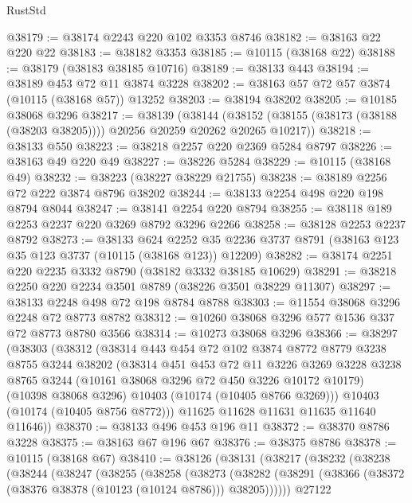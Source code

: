 \begin{lexlean}{RustStd}
\begin{coremodule}
@38179 := @38174 @2243 @220 @102 @3353 @8746
@38182 := @38163 @22 @220 @22
@38183 := @38182 @3353
@38185 := @10115 (@38168 @22)
@38188 := @38179 (@38183 @38185 @10716)
@38189 := @38133 @443
@38194 := @38189 @453 @72 @11 @3874 @3228
@38202 := @38163 @57 @72 @57 @3874 (@10115 (@38168 @57)) @13252
@38203 := @38194 @38202
@38205 := @10185 @38068 @3296
@38217 := @38139
    (@38144 (@38152 (@38155 (@38173 (@38188 (@38203 @38205)))) @20256 @20259 @20262 @20265 @10217))
@38218 := @38133 @550
@38223 := @38218 @2257 @220 @2369 @5284 @8797
@38226 := @38163 @49 @220 @49
@38227 := @38226 @5284
@38229 := @10115 (@38168 @49)
@38232 := @38223 (@38227 @38229 @21755)
@38238 := @38189 @2256 @72 @222 @3874 @8796 @38202
@38244 := @38133 @2254 @498 @220 @198 @8794 @8044
@38247 := @38141 @2254 @220 @8794
@38255 := @38118 @189 @2253 @2237 @220 @3269 @8792 @3296 @2266
@38258 := @38128 @2253 @2237 @8792
@38273 := @38133
    @624
    @2252
    @35
    @2236
    @3737
    @8791
    (@38163 @123 @35 @123 @3737 (@10115 (@38168 @123)) @12209)
@38282 := @38174 @2251 @220 @2235 @3332 @8790 (@38182 @3332 @38185 @10629)
@38291 := @38218 @2250 @220 @2234 @3501 @8789 (@38226 @3501 @38229 @11307)
@38297 := @38133 @2248 @498 @72 @198 @8784 @8788
@38303 := @11554 @38068 @3296 @2248 @72 @8773 @8782
@38312 := @10260 @38068 @3296 @577 @1536 @337 @72 @8773 @8780 @3566
@38314 := @10273 @38068 @3296
@38366 := @38297
    (@38303
      (@38312
        (@38314
          @443
          @454
          @72
          @102
          @3874
          @8772
          @8779
          @3238
          @8755
          @3244
          @38202
          (@38314
            @451
            @453
            @72
            @11
            @3226
            @3269
            @3228
            @3238
            @8765
            @3244
            (@10161 @38068 @3296 @72 @450 @3226 @10172 @10179)
            (@10398 @38068 @3296)
            @10403
            (@10174 (@10405 @8766 @3269)))
          @10403
          (@10174 (@10405 @8756 @8772)))
        @11625
        @11628
        @11631
        @11635
        @11640
        @11646))
@38370 := @38133 @496 @453 @196 @11
@38372 := @38370 @8786 @3228
@38375 := @38163 @67 @196 @67
@38376 := @38375 @8786
@38378 := @10115 (@38168 @67)
@38410 := @38126
    (@38131
      (@38217
        (@38232
          (@38238
            (@38244
              (@38247
                (@38255
                  (@38258
                    (@38273
                      (@38282
                        (@38291 (@38366 (@38372 (@38376 @38378 (@10123 (@10124 @8786))) @38205))))))
                  @27122

\end{coremodule}
\end{lexlean}
